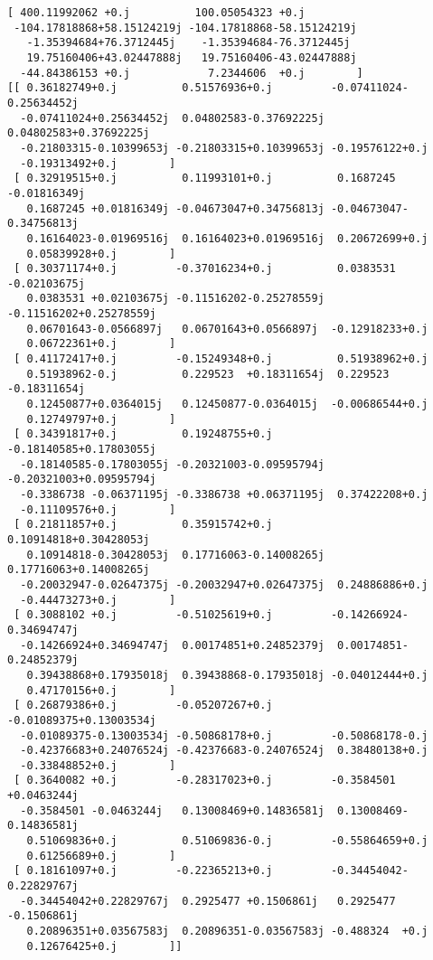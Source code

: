 \documentclass[11pt]{article}
\begin{document}
    \begin{Verbatim}[commandchars=\\\{\}]
[ 400.11992062 +0.j          100.05054323 +0.j
 -104.17818868+58.15124219j -104.17818868-58.15124219j
   -1.35394684+76.3712445j    -1.35394684-76.3712445j
   19.75160406+43.02447888j   19.75160406-43.02447888j
  -44.84386153 +0.j            7.2344606  +0.j        ]
[[ 0.36182749+0.j          0.51576936+0.j         -0.07411024-0.25634452j
  -0.07411024+0.25634452j  0.04802583-0.37692225j  0.04802583+0.37692225j
  -0.21803315-0.10399653j -0.21803315+0.10399653j -0.19576122+0.j
  -0.19313492+0.j        ]
 [ 0.32919515+0.j          0.11993101+0.j          0.1687245 -0.01816349j
   0.1687245 +0.01816349j -0.04673047+0.34756813j -0.04673047-0.34756813j
   0.16164023-0.01969516j  0.16164023+0.01969516j  0.20672699+0.j
   0.05839928+0.j        ]
 [ 0.30371174+0.j         -0.37016234+0.j          0.0383531 -0.02103675j
   0.0383531 +0.02103675j -0.11516202-0.25278559j -0.11516202+0.25278559j
   0.06701643-0.0566897j   0.06701643+0.0566897j  -0.12918233+0.j
   0.06722361+0.j        ]
 [ 0.41172417+0.j         -0.15249348+0.j          0.51938962+0.j
   0.51938962-0.j          0.229523  +0.18311654j  0.229523  -0.18311654j
   0.12450877+0.0364015j   0.12450877-0.0364015j  -0.00686544+0.j
   0.12749797+0.j        ]
 [ 0.34391817+0.j          0.19248755+0.j         -0.18140585+0.17803055j
  -0.18140585-0.17803055j -0.20321003-0.09595794j -0.20321003+0.09595794j
  -0.3386738 -0.06371195j -0.3386738 +0.06371195j  0.37422208+0.j
  -0.11109576+0.j        ]
 [ 0.21811857+0.j          0.35915742+0.j          0.10914818+0.30428053j
   0.10914818-0.30428053j  0.17716063-0.14008265j  0.17716063+0.14008265j
  -0.20032947-0.02647375j -0.20032947+0.02647375j  0.24886886+0.j
  -0.44473273+0.j        ]
 [ 0.3088102 +0.j         -0.51025619+0.j         -0.14266924-0.34694747j
  -0.14266924+0.34694747j  0.00174851+0.24852379j  0.00174851-0.24852379j
   0.39438868+0.17935018j  0.39438868-0.17935018j -0.04012444+0.j
   0.47170156+0.j        ]
 [ 0.26879386+0.j         -0.05207267+0.j         -0.01089375+0.13003534j
  -0.01089375-0.13003534j -0.50868178+0.j         -0.50868178-0.j
  -0.42376683+0.24076524j -0.42376683-0.24076524j  0.38480138+0.j
  -0.33848852+0.j        ]
 [ 0.3640082 +0.j         -0.28317023+0.j         -0.3584501 +0.0463244j
  -0.3584501 -0.0463244j   0.13008469+0.14836581j  0.13008469-0.14836581j
   0.51069836+0.j          0.51069836-0.j         -0.55864659+0.j
   0.61256689+0.j        ]
 [ 0.18161097+0.j         -0.22365213+0.j         -0.34454042-0.22829767j
  -0.34454042+0.22829767j  0.2925477 +0.1506861j   0.2925477 -0.1506861j
   0.20896351+0.03567583j  0.20896351-0.03567583j -0.488324  +0.j
   0.12676425+0.j        ]]

    \end{Verbatim}
\end{document}
